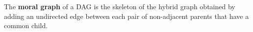 \begin{definition}
The \textbf{moral graph} of a DAG is the skeleton of the hybrid graph obtained by adding an undirected edge between each pair of non-adjacent parents that have a common child. 
\end{definition}




